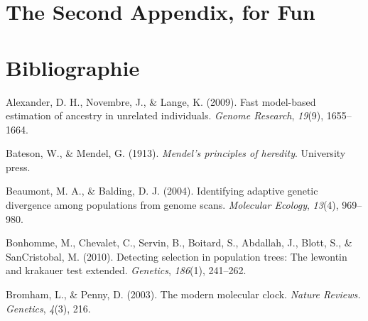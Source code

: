 \documentclass[12pt,twoside]{ugathesis}
\begin{document}
\begin{Shaded}
\begin{Highlighting}[]

\StringTok{ }\NormalTok{(}\NormalTok{, }
                \NormalTok{, }
                \NormalTok{, }
                \NormalTok{, }
                \NormalTok{, }
                \NormalTok{, }
                \NormalTok{, }
                \NormalTok{)}
\end{Highlighting}
\end{Shaded}
\chapter{The Second Appendix, for
Fun}\label{the-second-appendix-for-fun}

\backmatter

\chapter*{Bibliographie}\label{bibliographie}

\noindent

\setlength{\parindent}{-0.20in} \setlength{\leftskip}{0.20in}
\setlength{\parskip}{8pt}

\hypertarget{refs}{}
\hypertarget{ref-alexander2009fast}{}
Alexander, D. H., Novembre, J., \& Lange, K. (2009). Fast model-based
estimation of ancestry in unrelated individuals. \emph{Genome Research},
\emph{19}(9), 1655--1664.

\hypertarget{ref-bateson1913mendel}{}
Bateson, W., \& Mendel, G. (1913). \emph{Mendel's principles of
heredity}. University press.

\hypertarget{ref-beaumont2004identifying}{}
Beaumont, M. A., \& Balding, D. J. (2004). Identifying adaptive genetic
divergence among populations from genome scans. \emph{Molecular
Ecology}, \emph{13}(4), 969--980.

\hypertarget{ref-bonhomme2010detecting}{}
Bonhomme, M., Chevalet, C., Servin, B., Boitard, S., Abdallah, J.,
Blott, S., \& SanCristobal, M. (2010). Detecting selection in population
trees: The lewontin and krakauer test extended. \emph{Genetics},
\emph{186}(1), 241--262.

\hypertarget{ref-bromham2003modern}{}
Bromham, L., \& Penny, D. (2003). The modern molecular clock.
\emph{Nature Reviews. Genetics}, \emph{4}(3), 216.
\end{document}
